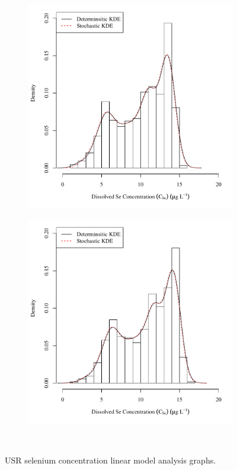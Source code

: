 \subfiguremid
\begin{landscape}
	\begin{figure}
		\begin{subfigure}{0.7\textwidth}
			\centering
			\includegraphics[width=\tableCustomSize]{"Figures/Results_USR/Stochastic/c d&s est FLS"}
		\end{subfigure}%
		\begin{subfigure}{0.7\textwidth}
			\centering
			\includegraphics[width=\tableCustomSize]{"Figures/Results_USR/Stochastic/c d&s est FLY"}
		\end{subfigure}\\
		\caption{USR selenium concentration linear model analysis graphs.}
	\end{figure}
\end{landscape}

